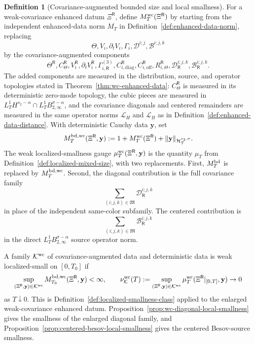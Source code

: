 \documentclass[10pt]{amsart}
\numberwithin{equation}{section}
\theoremstyle{plain}
\theoremstyle{definition}
\newtheorem{definition}[theorem]{Definition}
\theoremstyle{remark}
\begin{document}
\begin{definition}[Covariance-augmented bounded size and local smallness]\label{def:wc-bounded-size}
For a weak-covariance enhanced datum \(\Xi^{\mathsf R}\), define \(M_T^{\rm wc}(\Xi^{\mathsf R})\) by starting from the independent enhanced-data norm \(M_T\) in Definition~\ref{def:enhanced-data-norm}, replacing
\[
        \Theta,V_i,\partial_tV_i,\Gamma_i,\mathcal D^{i;j},\mathcal B^{i;j,k}
\]
by the covariance-augmented components
\[
        \Theta^{\mathsf R},C_\Theta^{\mathsf R},V_i^{\mathsf R},\partial_tV_i^{\mathsf R},
        \Gamma_{i,\mathsf R}^{(3)},C_{i,\mathrm{diag}}^{\mathsf R},C_{i,\mathrm{off}}^{\mathsf R},R_{i,\Theta}^{\mathsf R},
        \mathcal D_{\mathsf R}^{i;j,k},\mathcal B_{\mathsf R}^{i;j,k}.
\]
The added components are measured in the distribution, source, and operator topologies stated in Theorem~\ref{thm:wc-enhanced-data}: \(C_\Theta^{\mathsf R}\) is measured in its deterministic zero-mode topology, the cubic pieces are measured in \(L_T^1H^{s_2-\alpha}\cap L_T^1B_{2,\infty}^{\sigma-\alpha}\), and the covariance diagonals and centered remainders are measured in the same operator norms \(\mathcal L_H\) and \(\mathcal L_B\) as in Definition~\ref{def:enhanced-data-distance}.  With deterministic Cauchy data \(\mathbf y\), set
\begin{equation}\label{eq:wc-bd-size}
        M_T^{\rm bd,wc}(\Xi^{\mathsf R},\mathbf y)
        :=1+M_T^{\rm wc}(\Xi^{\mathsf R})+\|\mathbf y\|_{\mathcal H_T^{s_2,\sigma}}.
\end{equation}
The weak localized-smallness gauge \(\mu_T^{\rm wc}(\Xi^{\mathsf R},\mathbf y)\) is the quantity \(\mu_T\) from Definition~\ref{def:localized-mixed-size}, with two replacements.  First, \(M_T^{\rm bd}\) is replaced by \(M_T^{\rm bd,wc}\).  Second, the diagonal contribution is the full covariance family
\[
        \sum_{(i;j,k)\in\mathfrak M}\mathcal D_{\mathsf R}^{i;j,k}
\]
in place of the independent same-color subfamily.  The centered contribution is
\[
        \sum_{(i;j,k)\in\mathfrak M}\mathcal B_{\mathsf R}^{i;j,k}
\]
in the direct \(L_T^1B_{2,\infty}^{\sigma-\alpha}\) source operator norm.

A family \(\mathcal K^{\rm wc}\) of covariance-augmented data and deterministic data is weak localized-small on \([0,T_0]\) if
\[
        \sup_{(\Xi^{\mathsf R},\mathbf y)\in\mathcal K^{\rm wc}}
        M_{T_0}^{\rm bd,wc}(\Xi^{\mathsf R},\mathbf y)<\infty,
        \qquad
        \nu_{\mathcal K}^{\rm wc}(T)
        :=\sup_{(\Xi^{\mathsf R},\mathbf y)\in\mathcal K^{\rm wc}}
        \mu_T^{\rm wc}(\Xi^{\mathsf R}|_{[0,T]},\mathbf y)\to0
\]
as \(T\downarrow0\).  This is Definition~\ref{def:localized-smallness-class} applied to the enlarged weak-covariance enhanced datum.  Proposition~\ref{prop:wc-diagonal-local-smallness} gives the smallness of the enlarged diagonal family, and Proposition~\ref{prop:centered-besov-local-smallness} gives the centered Besov-source smallness.
\end{definition}
\end{document}
